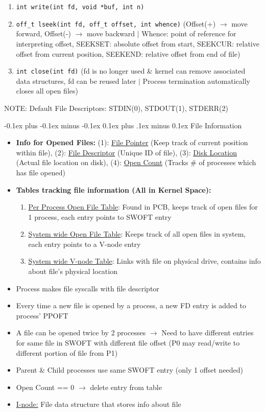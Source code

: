 \documentclass[landscape]{article}
\makeatletter
\renewcommand{\subsection}{\@startsection{subsection}{2}{0mm}%
  {-0.1ex plus -0.1ex minus -0.1ex}%
  {0.1ex plus .1ex minus 0.1ex}%
{\normalfont\scriptsize\bfseries}}
\makeatother
\begin{document}
\begin{multicols*}{6}
\begin{itemize}
\begin{enumerate}
        \item \verb|int write(int fd, void *buf, int n)|
        \item \verb|off_t lseek(int fd, off_t offset, int whence)| (Offset(+) $\rightarrow$ move forward, Offset(-) $\rightarrow$ move backward $\vert$ Whence: point of reference for interpreting offset, SEEKSET: absolute offset from start, SEEKCUR: relative offset from current position, SEEKEND: relative offset from end of file)
        \item \verb|int close(int fd)| (fd is no longer used \& kernel can remove associated data structures, fd can be reused later $\vert$ Process termination automatically closes all open files)
      \end{enumerate}
      NOTE: Default File Descriptors: STDIN(0), STDOUT(1), STDERR(2)
    \end{itemize}

    \subsection{File Information}
    \begin{itemize}
      \item \textbf{Info for Opened Files:} (1): \underline{File Pointer} (Keep track of current position within file), (2): \underline{File Descriptor} (Unique ID of file), (3): \underline{Disk Location} (Actual file location on disk), (4): \underline{Open Count} (Tracks \# of processes which has file opened)
      \item \textbf{Tables tracking file information (All in Kernel Space):}
      \begin{enumerate}
        \item \underline{Per Process Open File Table}: Found in PCB, keeps track of open files for 1 process, each entry points to SWOFT entry
        \item \underline{System wide Open File Table}: Keeps track of all open files in system, each entry points to a V-node entry
        \item \underline{System wide V-node Table}: Links with file on physical drive, contains info about file's physical location
      \end{enumerate}
      \item Process makes file syscalls with file descriptor
      \item Every time a new file is opened by a process, a new FD entry is added to process' PPOFT
      \item A file can be opened twice by 2 processes $\rightarrow$ Need to have different entries for same file in SWOFT with different file offset (P0 may read/write to different portion of file from P1)
      \item Parent \& Child processes use same SWOFT entry (only 1 offset needed)
      \item Open Count == 0 $\rightarrow$ delete entry from table
      \item \underline{I-node:} File data structure that stores info about file 
    \end{itemize}


\end{multicols*}
\end{document}
